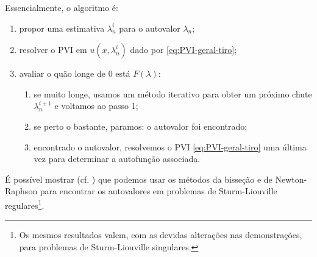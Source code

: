 \documentclass[twocolumn,showpacs,%
  nofootinbib,aps,superscriptaddress,%
  eqsecnum,prd,notitlepage,showkeys,10pt]{revtex4-1}
\begin{document}
Essencialmente, o algoritmo é:
%
\begin{enumerate}
    \item propor uma estimativa $\lambda_n^i$ para o autovalor $\lambda_n$; 
    \item resolver o PVI em $u(x, \lambda_n^i)$ dado por \eqref{eq:PVI-geral-tiro};
    \item avaliar o quão longe de $0$ está $F(\lambda)$:
    \begin{enumerate}
        \item se muito longe, usamos um método iterativo para obter um próximo 
        chute $\lambda_n^{i+1}$ e voltamos ao passo 1;
        \item se perto o bastante, paramos: o autovalor foi encontrado;
        \item encontrado o autovalor, resolvemos o PVI \eqref{eq:PVI-geral-tiro} uma
        última vez para determinar a autofunção associada.
    \end{enumerate}
\end{enumerate}
%
É possível mostrar (cf. \cite[p.~304-305, Teo.~186 - 188]{Sturm-Liouville}) que
podemos usar os métodos da bisseção e de Newton-Raphson para encontrar os autovalores
em problemas de Sturm-Liouville regulares\footnote{Os mesmos resultados valem, com as devidas
alterações nas demonstrações, para problemas de Sturm-Liouville singulares.}.
\end{document}
